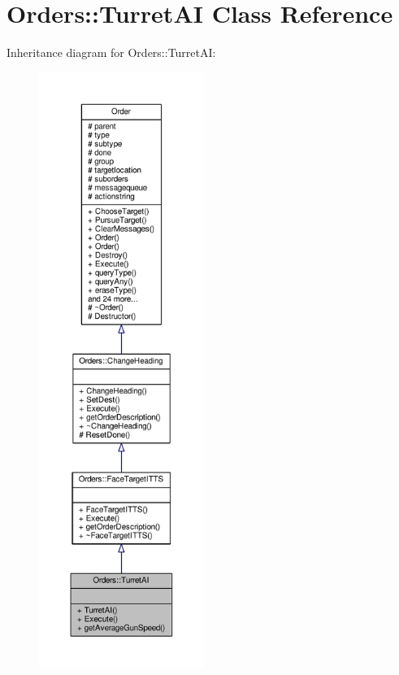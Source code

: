 \hypertarget{classOrders_1_1TurretAI}{}\section{Orders\+:\+:Turret\+AI Class Reference}
\label{classOrders_1_1TurretAI}


Inheritance diagram for Orders\+:\+:Turret\+AI\+:
\nopagebreak
\begin{figure}[H]
\begin{center}
\leavevmode
\includegraphics[height=550pt]{d3/dca/classOrders_1_1TurretAI__inherit__graph}
\end{center}
\end{figure}


